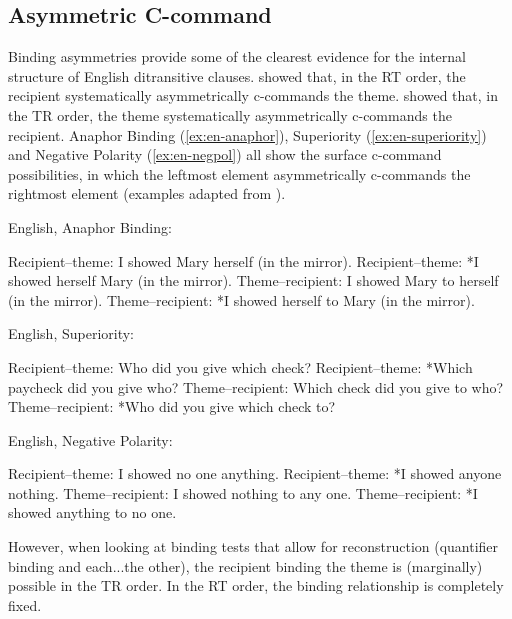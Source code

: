	\subsection{Asymmetric C-command}
	Binding asymmetries provide some of the clearest evidence for the internal structure of English ditransitive clauses. \cite{Barss.1986} showed that, in the RT order, the recipient systematically asymmetrically c-commands the theme. \cite{Aoun.1989} showed that, in the TR order, the theme systematically asymmetrically c-commands the recipient.  Anaphor Binding (\ref{ex:en-anaphor}), Superiority (\ref{ex:en-superiority}) and Negative Polarity (\ref{ex:en-negpol}) all show the surface c-command possibilities, in which the leftmost element asymmetrically c-commands the rightmost element (examples adapted from \cite{Aoun.1989}).
\begin{exe}
	\ex English, Anaphor Binding:\label{ex:en-anaphor}
\begin{xlist}
\ex Recipient--theme: I showed Mary herself (in the mirror).
\ex Recipient--theme: *I showed herself Mary (in the mirror).
\ex Theme--recipient: I showed Mary to herself (in the mirror).
\ex Theme--recipient: *I showed herself to Mary (in the mirror).
\end{xlist}
\ex English, Superiority:\label{ex:en-superiority}
\begin{xlist}
\ex Recipient--theme: Who did you give which check?
\ex Recipient--theme: *Which paycheck did you give who?
\ex Theme--recipient: Which check did you give to who?
\ex Theme--recipient: *Who did you give which check to?
\end{xlist}
\ex English, Negative Polarity:\label{ex:en-negpol}
\begin{xlist}
\ex Recipient--theme: I showed no one anything.
\ex Recipient--theme: *I showed anyone nothing.
\ex Theme--recipient: I showed nothing to any one.
\ex Theme--recipient: *I showed anything to no one.
\end{xlist}
\end{exe}

However, when looking at binding tests that allow for reconstruction (quantifier binding and each...the other), the recipient binding the theme is (marginally) possible in the TR order. In the RT order, the binding relationship is completely fixed. 

